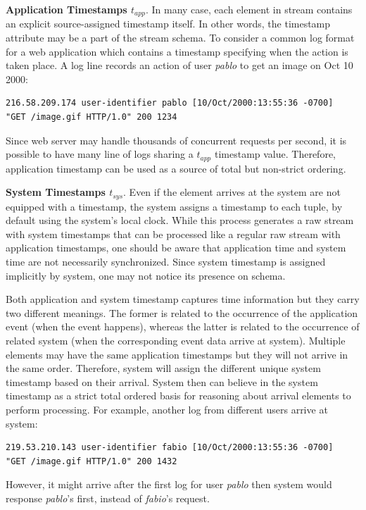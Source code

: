 \textbf{Application Timestamps $t_{app}$}. In many case, each element in stream contains an explicit source-assigned timestamp itself. In other words, the timestamp attribute may be a part of the stream schema. To consider  a common log format for a web application which contains a timestamp specifying when the action is taken place. 
A log line records an action of user \textit{pablo} to get an image on Oct 10 2000:
\begin{verbatim}
216.58.209.174 user-identifier pablo [10/Oct/2000:13:55:36 -0700] 
"GET /image.gif HTTP/1.0" 200 1234
\end{verbatim}
Since web server may handle thousands of concurrent requests per second, it is possible to have many line of logs sharing a $t_{app}$ timestamp value. Therefore, application timestamp can be used as a source of total but non-strict ordering.

\textbf{System Timestamps $t_{sys}$}. Even if the element arrives at the system are not equipped with a timestamp, the system assigns a timestamp to each tuple, by default using the system’s local clock. While this process generates a raw stream with system timestamps that can be processed like a regular raw stream with application timestamps, one should be aware that application time and system time are not necessarily synchronized\citep{Kramer:2009}. Since system timestamp is assigned implicitly by system, one may not notice its presence on schema. 


Both application and system timestamp captures time information but they carry two different meanings. The former is related to the occurrence of the application event (when the event happens), whereas the latter is related to the occurrence of related system (when the corresponding event data arrive at system). Multiple elements may have the same application timestamps but they will not arrive in the same order. Therefore, system will assign the different unique system timestamp based on their arrival. System then can believe in the system timestamp as a strict total ordered basis for reasoning about arrival elements to perform processing. For example, another log from different users arrive at system:
\begin{verbatim}
219.53.210.143 user-identifier fabio [10/Oct/2000:13:55:36 -0700] 
"GET /image.gif HTTP/1.0" 200 1432
\end{verbatim}
However, it might arrive after the first log for user \textit{pablo} then system would response \textit{pablo}'s first, instead of \textit{fabio}'s request.

